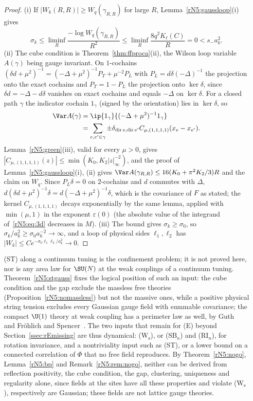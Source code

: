\begin{proof}
(i) If $|W_k(R,R)|\ge W_q(\gamma_{R,R})$ for large $R$,
Lemma~\ref{rN5:gaussloop}(i) gives
\[
\sigma_k\le\liminf_R\frac{-\log W_q(\gamma_{R,R})}{R^2}\le\liminf_R
\frac{8q^2K_\ell(C)}R=0<s_-a_k^2.
\] (ii) The cube condition is Theorem~\ref{thm:ffproca}(ii),
the Wilson loop variable $A(\gamma)$ being gauge invariant. On
$1$-cochains $(\delta d+\mu^2)^{-1}=(-\Delta+\mu^2)^{-1}P_T+\mu^{-2}P_L$ with
$P_L=d\delta(-\Delta)^{-1}$ the projection onto the exact cochains and $P_T=1-
P_L$ the projection onto $\ker\delta$, since $\delta d=-\Delta-d\delta$ vanishes
on exact cochains and equals $-\Delta$ on $\ker\delta$. For a closed path
$\gamma$ the indicator cochain $1_\gamma$ (signed by the orientation) lies in
$\ker\delta$, so
\[
\begin{split}
\Var A(\gamma)&=\ip{1_\gamma}{(-\Delta+\mu^2)^{-1}1_\gamma}\\
&=\sum_{e,e'\in\gamma}\pm\delta_{\operatorname{dir}e,\operatorname{dir}e'}
C_{\mu,(1,1,1,1)}(x_e-x_{e'}).
\end{split}
\]
Lemma~\ref{rN5:green}(iii), valid for every $\mu>0$, gives
$|C_{\mu,(1,1,1,1)}(z)|\le\min(K_0,K_2|z|_\infty^{-2})$, and the proof of
Lemma~\ref{rN5:gaussloop}(i), (ii) gives
$\Var A(\gamma_{R,R})\le16(K_0+\pi^2K_2/3)R$ and the claim on $W_q$.
Since $P_L\delta=0$ on $2$-cochains and $d$ commutes with $\Delta$, $d(\delta d+
\mu^2)^{-1}\delta=d(-\Delta+\mu^2)^{-1}\delta$, which is the covariance of $F$
as stated; the kernel $C_{\mu,(1,1,1,1)}$ decays exponentially by the same
lemma, applied with $\min(\mu,1)$ in the exponent $\varepsilon(0)$ (the
absolute value of the integrand of~\eqref{rN5:eq:3d} decreases in $M$). (iii) The bound gives
$\sigma_k\ge\sigma_0$, so $\sigma_k/a_k^2\ge\sigma_0a_k^{-2}\to\infty$, and a
loop of physical sides $\ell_1,\ell_2$ has $|W_k|\le Ce^{-\sigma_0\ell_1\ell_2/
a_k^2}\to0$.
\end{proof}

\begin{remark}[status]\label{rN5:rem:st}
(ST) along a continuum tuning is the confinement problem; it is not proved
here, nor is any area law for $\SU(N)$ at the weak couplings of a continuum
tuning. Theorem~\ref{rN5:stgauss} fixes the logical position of such an
input: the cube condition and the gap exclude the massless free theories
(Proposition~\ref{rN5:nomassless}) but not the massive ones, while a
positive physical string tension excludes every Gaussian gauge field with
summable covariance; the compact $\U(1)$ theory at weak coupling has a
perimeter law as well, by Guth~\cite{Gut80} and Fr\"ohlich and
Spencer~\cite{FS82}. The two inputs that remain for (E) beyond
Section~\ref{ssec:rEmissing} are thus dynamical: (W$_{\mathrm s}$), or
(SB$_n$) and (RI$_n$), for rotation invariance, and a nontriviality input
such as (ST), or a lower bound on a connected correlation of $\Phi$ that no
free field reproduces. By Theorem~\ref{rN5:nogo}, Lemma~\ref{rN5:bp} and
Remark~\ref{rN5:rem:nogo}, neither can be derived from reflection
positivity, the cube condition, the gap, clustering, uniqueness and
regularity alone, since fields at the sites have all these properties and
violate (W$_{\mathrm s}$), respectively are Gaussian; these fields are not
lattice gauge theories.
\end{remark}
